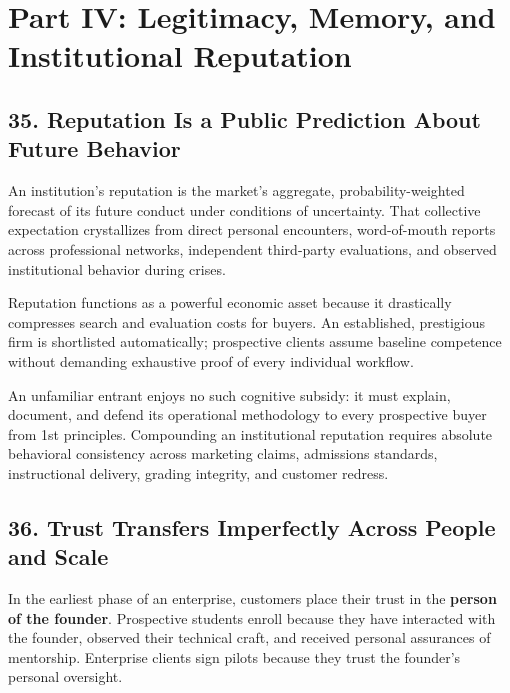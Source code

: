 \section*{Part IV: Legitimacy, Memory, and Institutional Reputation}

\subsection*{35. Reputation Is a Public Prediction About Future Behavior}

An institution's reputation is the market's aggregate, probability-weighted forecast of its future conduct under conditions of uncertainty. That collective expectation crystallizes from direct personal encounters, word-of-mouth reports across professional networks, independent third-party evaluations, and observed institutional behavior during crises.

Reputation functions as a powerful economic asset because it drastically compresses search and evaluation costs for buyers. An established, prestigious firm is shortlisted automatically; prospective clients assume baseline competence without demanding exhaustive proof of every individual workflow. 

An unfamiliar entrant enjoys no such cognitive subsidy: it must explain, document, and defend its operational methodology to every prospective buyer from 1st principles. Compounding an institutional reputation requires absolute behavioral consistency across marketing claims, admissions standards, instructional delivery, grading integrity, and customer redress.

\subsection*{36. Trust Transfers Imperfectly Across People and Scale}

In the earliest phase of an enterprise, customers place their trust in the \textbf{person of the founder}. Prospective students enroll because they have interacted with the founder, observed their technical craft, and received personal assurances of mentorship. Enterprise clients sign pilots because they trust the founder's personal oversight.

